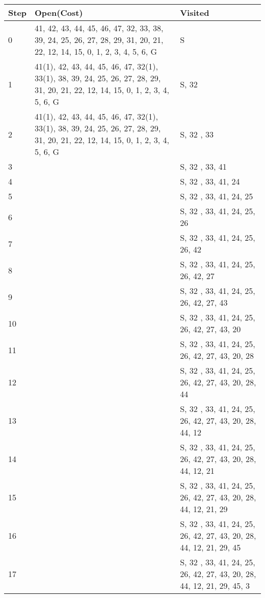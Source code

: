 \begin{landscape}

\begin{table}
\centering
\begin{tabular}{l|ll}
Step & Open(Cost) & Visited  \\ 
\hline
0    & 41, 42, 43, 44, 45, 46, 47, 32, 33, 38, 39, 24, 25, 26, 27, 28, 29, 31, 20, 21, 22, 12, 14, 15, 0, 1, 2, 3, 4, 5, 6, G           & S        \\
1    & 41(1), 42, 43, 44, 45, 46, 47, 32(1), 33(1), 38, 39, 24, 25, 26, 27, 28, 29, 31, 20, 21, 22, 12, 14, 15, 0, 1, 2, 3, 4, 5, 6, G           & S, 32    \\
2    & 41(1), 42, 43, 44, 45, 46, 47, 32(1), 33(1), 38, 39, 24, 25, 26, 27, 28, 29, 31, 20, 21, 22, 12, 14, 15, 0, 1, 2, 3, 4, 5, 6, G           & S, 32 , 33        \\
3    &            & S, 32 , 33, 41         \\
4    &            & S, 32 , 33, 41, 24         \\
5    &            & S, 32 , 33, 41, 24, 25         \\
6    &            & S, 32 , 33, 41, 24, 25, 26         \\
7    &            & S, 32 , 33, 41, 24, 25, 26, 42         \\
8    &            & S, 32 , 33, 41, 24, 25, 26, 42, 27         \\
9    &            & S, 32 , 33, 41, 24, 25, 26, 42, 27, 43         \\
10   &            & S, 32 , 33, 41, 24, 25, 26, 42, 27, 43, 20          \\
11   &            & S, 32 , 33, 41, 24, 25, 26, 42, 27, 43, 20, 28         \\
12   &            & S, 32 , 33, 41, 24, 25, 26, 42, 27, 43, 20, 28, 44          \\
13   &            & S, 32 , 33, 41, 24, 25, 26, 42, 27, 43, 20, 28, 44, 12        \\
14   &            & S, 32 , 33, 41, 24, 25, 26, 42, 27, 43, 20, 28, 44, 12, 21         \\
15   &            &  S, 32 , 33, 41, 24, 25, 26, 42, 27, 43, 20, 28, 44, 12, 21, 29        \\
16   &            & S, 32 , 33, 41, 24, 25, 26, 42, 27, 43, 20, 28, 44, 12, 21, 29, 45         \\
17   &            & S, 32 , 33, 41, 24, 25, 26, 42, 27, 43, 20, 28, 44, 12, 21, 29, 45, 3         \\

\end{tabular}
\end{table}
\end{landscape}
